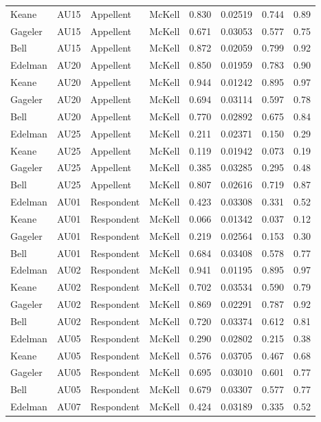 \documentclass{monashthesis}
\begin{document}
\begin{center}
\begin{longtable}{llllllll}
Keane & AU15 & Appellent & McKell & 0.830 & 0.02519 & 0.744 & 0.89 \\
Gageler & AU15 & Appellent & McKell & 0.671 & 0.03053 & 0.577 & 0.75 \\
Bell & AU15 & Appellent & McKell & 0.872 & 0.02059 & 0.799 & 0.92 \\
Edelman & AU20 & Appellent & McKell & 0.850 & 0.01959 & 0.783 & 0.90 \\
Keane & AU20 & Appellent & McKell & 0.944 & 0.01242 & 0.895 & 0.97 \\
Gageler & AU20 & Appellent & McKell & 0.694 & 0.03114 & 0.597 & 0.78 \\
Bell & AU20 & Appellent & McKell & 0.770 & 0.02892 & 0.675 & 0.84 \\
Edelman & AU25 & Appellent & McKell & 0.211 & 0.02371 & 0.150 & 0.29 \\
Keane & AU25 & Appellent & McKell & 0.119 & 0.01942 & 0.073 & 0.19 \\
Gageler & AU25 & Appellent & McKell & 0.385 & 0.03285 & 0.295 & 0.48 \\
Bell & AU25 & Appellent & McKell & 0.807 & 0.02616 & 0.719 & 0.87 \\
Edelman & AU01 & Respondent & McKell & 0.423 & 0.03308 & 0.331 & 0.52 \\
Keane & AU01 & Respondent & McKell & 0.066 & 0.01342 & 0.037 & 0.12 \\
Gageler & AU01 & Respondent & McKell & 0.219 & 0.02564 & 0.153 & 0.30 \\
Bell & AU01 & Respondent & McKell & 0.684 & 0.03408 & 0.578 & 0.77 \\
Edelman & AU02 & Respondent & McKell & 0.941 & 0.01195 & 0.895 & 0.97 \\
Keane & AU02 & Respondent & McKell & 0.702 & 0.03534 & 0.590 & 0.79 \\
Gageler & AU02 & Respondent & McKell & 0.869 & 0.02291 & 0.787 & 0.92 \\
Bell & AU02 & Respondent & McKell & 0.720 & 0.03374 & 0.612 & 0.81 \\
Edelman & AU05 & Respondent & McKell & 0.290 & 0.02802 & 0.215 & 0.38 \\
Keane & AU05 & Respondent & McKell & 0.576 & 0.03705 & 0.467 & 0.68 \\
Gageler & AU05 & Respondent & McKell & 0.695 & 0.03010 & 0.601 & 0.77 \\
Bell & AU05 & Respondent & McKell & 0.679 & 0.03307 & 0.577 & 0.77 \\
Edelman & AU07 & Respondent & McKell & 0.424 & 0.03189 & 0.335 & 0.52 \\

\end{longtable}
\end{center}
\end{document}
